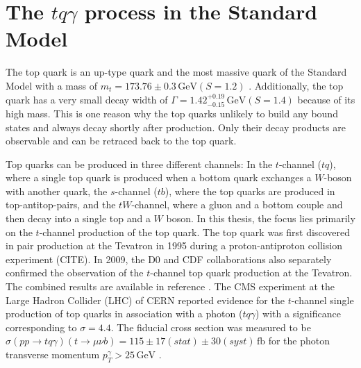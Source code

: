 \section{The \texorpdfstring{$tq\gamma$}{tqGamma} process in the Standard Model}
\label{sec:tqgammainsm}

The top quark is an up-type quark and the most massive quark of the Standard Model with a mass of $m_t = 173.76 \pm 0.3 \,\si{\giga\electronvolt} (S =1.2)$ \cite{pdg}. Additionally, the top quark has a very small decay width of $\Gamma = 1.42^{+0.19}_{-0.15} \,\si{\giga\electronvolt} (S=1.4)$ \cite{pdg} because of its high mass.
This is one reason why the top quarks unlikely to build any bound states and always decay shortly after production. Only their decay products are observable and can be retraced back to the top quark. 

Top quarks can be produced in three different channels: In the $t$-channel ($tq$), where a single top quark is produced when a bottom quark exchanges a $W$-boson with another quark, the $s$-channel ($tb$), where the top quarks are produced in top-antitop-pairs, and the $tW$-channel, where a gluon and a bottom couple and then decay into a single top and a $W$ boson. In this thesis, the focus lies primarily on the $t$-channel production of the top quark. 
The top quark was first discovered in pair production at the Tevatron in 1995 during a proton-antiproton collision experiment (CITE). In 2009, the D0 \cite{singletop1} and CDF \cite{singletop2} collaborations also separately confirmed the observation of the $t$-channel top quark production at the Tevatron. The combined results are available in reference \cite{singletop3}. 
The CMS experiment at the Large Hadron Collider (LHC) of CERN \cite{CMS} reported evidence for the $t$-channel single production of top quarks in association with a photon ($tq\gamma$) with a significance corresponding to $\sigma = 4.4$. The fiducial cross section 
was measured to be $\sigma(pp\rightarrow tq\gamma)(t\rightarrow\mu \nu b) = 115 \pm 17 (stat) \pm 30 (syst) \,\si{\femto\barn}$ for the photon transverse momentum $p_T^\gamma > 25 \,\si{\giga\electronvolt}$ \cite{PhysRevLett.121.221802}. 

